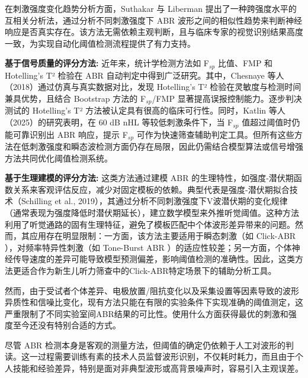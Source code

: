 在刺激强度变化趋势分析方面，Suthakar 与 Liberman\cite{Suthakar_Liberman2019} 提出了一种跨强度水平的互相关分析法，通过分析不同刺激强度下 ABR 波形之间的相似性趋势来判断神经响应是否真实存在。该方法无需依赖主观判断，且与临床专家的视觉识别结果高度一致，为实现自动化阈值检测流程提供了有力支持。

\textbf{基于信号质量的评分方法:}
近年来，统计学检测方法如 F$_{sp}$ 比值、FMP 和 Hotelling's T² 检验在 ABR 自动判定中得到广泛研究。其中，Chesnaye 等人（2018）通过仿真与真实数据对比，发现 Hotelling's T² 检验在灵敏度与检测时间兼具优势，且结合 Bootstrap 方法的 F$_{sp}$/FMP 显著提高误报控制能力。逐步判决测试的 Hotelling's T² 方法被认定具有很高的临床可行性。同时，Katlin 等人（2025）\cite{Katlin2025}的研究表明，在 60 dB nHL 等较低刺激条件下，当 F$_{sp}$ 值超过阈值时仍能可靠识别出 ABR 响应，提示 F$_{sp}$ 可作为快速筛查辅助判定工具。但所有这些方法在低刺激强度和瞬态波检测方面仍存在局限，因此仍需结合模型算法或信号增强方法共同优化阈值检测系统。

\textbf{基于生理建模的评分方法:}
这类方法通过建模 ABR 的生理特性，如强度-潜伏期函数关系来客观评估反应，减少对固定模板的依赖。典型代表是强度-潜伏期拟合技术（Schilling et al., 2019\cite{Schilling2019}），其通过分析不同刺激强度下V波潜伏期的变化规律（通常表现为强度降低时潜伏期延长），建立数学模型来外推听觉阈值。这种方法利用了听觉通路的固有生理特征，避免了模板匹配中个体波形差异带来的问题。然而，其应用存在明显限制：一方面，该方法主要适用于瞬态刺激（如 Click-ABR ），对频率特异性刺激（如 Tone-Burst ABR ）的适应性较差；另一方面，个体神经传导速度的差异可能导致模型预测偏差，影响阈值检测的准确性。因此，这类方法更适合作为新生儿听力筛查中的Click-ABR特定场景下的辅助分析工具。

然而，由于受试者个体差异、电极放置/阻抗变化以及采集设置等因素导致的波形异质性和信噪比变化，现有方法只能在有限的实验条件下实现准确的阈值测定，这严重限制了不同实验室间ABR结果的可比性。使用什么方面获得最优的刺激和强度至今还没有特别合适的方式。


尽管 ABR 检测本身是客观的测量方法，但阈值的确定仍依赖于人工对波形的判读。这一过程需要训练有素的技术人员监督波形识别，不仅耗时耗力，而且由于个人技能和经验差异，特别是面对非典型波形或高背景噪声时，容易引入主观误差。

